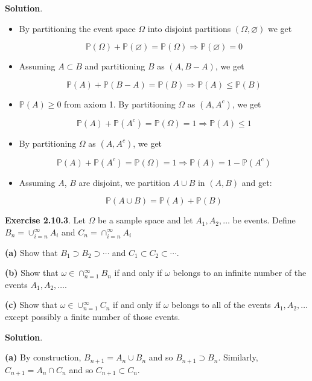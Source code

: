 \textbf{Solution}.

\begin{itemize}
\item
  By partitioning the event space \(\Omega\) into disjoint partitions
  \((\Omega, \varnothing)\) we get

  \[ \mathbb{P}(\Omega) + \mathbb{P}(\varnothing) = \mathbb{P}(\Omega) \Rightarrow \mathbb{P}(\varnothing) = 0 \]
\item
  Assuming \(A \subset B\) and partitioning \(B\) as \((A, B - A)\), we
  get

  \[ \mathbb{P}(A) + \mathbb{P}(B - A) = \mathbb{P}(B) \Rightarrow \mathbb{P}(A) \leq \mathbb{P}(B) \]
\item
  \(\mathbb{P}(A) \geq 0\) from axiom 1. By partitioning \(\Omega\) as
  \((A, A^{c})\), we get

  \[ \mathbb{P}(A) + \mathbb{P}(A^{c}) = \mathbb{P}(\Omega) = 1 \Rightarrow \mathbb{P}(A) \leq 1 \]
\item
  By partitioning \(\Omega\) as \((A, A^{c})\), we get

  \[ \mathbb{P}(A) + \mathbb{P}(A^{c}) = \mathbb{P}(\Omega) = 1 \Rightarrow \mathbb{P}(A) = 1 - \mathbb{P}(A^{c}) \]
\item
  Assuming \(A\), \(B\) are disjoint, we partition \(A \cup B\) in
  \((A, B)\) and get:

  \[ \mathbb{P}(A \cup B) = \mathbb{P}(A) + \mathbb{P}(B) \]
\end{itemize}

\textbf{Exercise 2.10.3}. Let \(\Omega\) be a sample space and let
\(A_{1}, A_{2}, \dots\) be events. Define \(B_{n} = \cup_{i=n}^{\infty} A_{i}\)
and \(C_{n} = \cap_{i=n}^{\infty} A_{i}\)

\textbf{(a)} Show that \(B_{1} \supset B_{2} \supset \cdots\) and
\(C_{1} \subset C_{2} \subset \cdots\).

\textbf{(b)} Show that \(\omega \in \cap_{n = 1}^{\infty} B_{n}\) if and
only if \(\omega\) belongs to an infinite number of the events
\(A_{1}, A_{2}, \dots\).

\textbf{(c)} Show that \(\omega \in \cup_{n = 1}^{\infty} C_{n}\) if and
only if \(\omega\) belongs to all of the events \(A_{1}, A_{2}, \dots\)
except possibly a finite number of those events.

\textbf{Solution}.

\textbf{(a)} By construction, \(B_{n+1} = A_{n} \cup B_{n}\) and so
\(B_{n + 1} \supset B_{n}\). Similarly, \(C_{n+1} = A_{n} \cap C_{n}\) and so
\(C_{n + 1} \subset C_{n}\).

